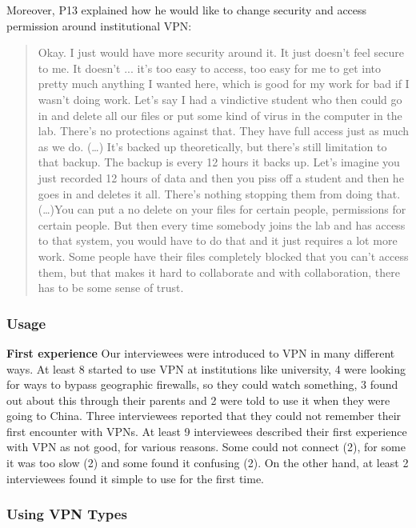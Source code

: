 Moreover, P13 explained how he would like to change security and access permission around institutional VPN:
\begin{quote}Okay. I just would have more security around it. It just doesn't feel secure to me. It doesn't ... it's too easy to access, too easy for me to get into pretty much anything I wanted here, which is good for my work for bad if I wasn't doing work. Let's say I had a vindictive student who then could go in and delete all our files or put some kind of virus in the computer in the lab. There's no protections against that. They have full access just as much as we do. (…) It's backed up theoretically, but there's still limitation to that backup. The backup is every 12 hours it backs up. Let's imagine you just recorded 12 hours of data and then you piss off a student and then he goes in and deletes it all. There's nothing stopping them from doing that. 
(\dots)You can put a no delete on your files for certain people, permissions for certain people. But then every time somebody joins the lab and has access to that system, you would have to do that and it just requires a lot more work. Some people have their files completely blocked that you can't access them, but that makes it hard to collaborate and with collaboration, there has to be some sense of trust.\end{quote}



\subsubsection{Usage}
\textbf{First experience}
Our interviewees were introduced to VPN in many different ways. At least 8 started to use VPN at institutions like university, 4 were looking for ways to bypass geographic firewalls, so they could watch something, 3 found out about this through their parents and 2 were told to use it when they were going to China. Three interviewees reported that they could not remember their first encounter with VPNs.  
At least 9 interviewees described their first experience with VPN as not good, for various reasons. Some could not connect (2), for some it was too slow (2) and some found it confusing (2).  On the other hand, at least 2 interviewees found it simple to use for the first time.


\subsubsection{Using VPN Types}

